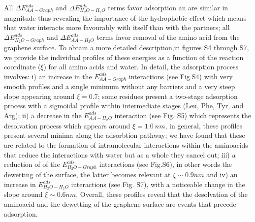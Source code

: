 \documentclass[journal=jcisd8,manuscript=article,layout=twocolumn]{achemso}
\begin{document}
All $\Delta E^{ads}_{AA-Graph}$ and $\Delta E^{ads}_{H_2O-H_2O}$ terms favor adsorption an are similar in magnitude thus revealing the importance of the hydrophobic effect which means that water interacts more favourably with itself than with the partners; all $\Delta E^{ads}_{H_2O-Graph}$ and $\Delta E^{ads}_{AA-H_2O}$ terms favor removal of the amino acid from the graphene surface.
To obtain a more detailed description,in figures S4 through S7, we provide  the individual profiles of these energies as a function of the reaction coordinate ($\xi$) for all amino acids and water.
In detail, the adsorption process involves: i) an increase in the $E^{ads}_{AA-Graph}$ interactions (see Fig.S4) with very smooth profiles and a single minimum without any barriers and a very steep slope appearing around $\xi=0.7$; some residues present a two-stage adsorption process with a sigmoidal profile within intermediate stages (Leu, Phe, Tyr, and Arg); ii) a decrease in the $E^{ads}_{AA-H_2O}$ interaction (see Fig. S5) which represents the desolvation process which appears around $\xi=1.0~nm$,  in general, these profiles present several minima along the adsorbtion pathway; we have found that these are related to the formation of intramolecular interactions within the aminoacids that reduce the interactions with water but as a whole they cancel out; iii) a reduction of of the $E^{ads}_{H_2O-Graph}$ interactions (see Fig.S6), in other words the dewetting of the surface, the latter becomes relevant at $\xi \sim 0.9 nm $ and iv) an increase in $E^{ads}_{H_2O-H_2O}$ interactions (see Fig. S7), with a noticeable change in the slope around $\xi \sim 0.6 nm $. Overall, these profiles reveal that the desolvation of the aminoacid and the dewetting of the graphene surface are events that precede adsorption.
\end{document}
